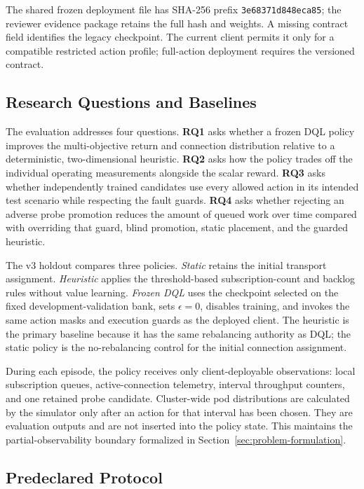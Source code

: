 The shared frozen deployment file has SHA-256 prefix
\texttt{3e68371d848eca85}; the reviewer evidence package retains the full hash
and weights. A missing contract field identifies the legacy checkpoint.
The current client permits it only for a compatible restricted action profile;
full-action deployment requires the versioned contract.

\subsection{Research Questions and Baselines}

The evaluation addresses four questions.  \textbf{RQ1} asks whether a frozen
DQL policy improves the multi-objective return and connection distribution
relative to a deterministic, two-dimensional heuristic.  \textbf{RQ2} asks
how the policy trades off the individual operating measurements alongside
the scalar reward. \textbf{RQ3} asks whether independently trained candidates use every allowed action in its
intended test scenario while respecting the fault guards.
\textbf{RQ4} asks whether rejecting an adverse probe promotion reduces the amount of queued work over time compared with overriding that
guard, blind promotion, static placement, and the guarded heuristic.

The v3 holdout compares three policies.  \emph{Static} retains the initial
transport assignment.  \emph{Heuristic} applies the threshold-based
subscription-count and backlog rules without value learning.  \emph{Frozen
DQL} uses the checkpoint selected on the fixed development-validation bank,
sets $\epsilon=0$, disables training, and invokes the same action masks and
execution guards as the deployed client.  The heuristic is the primary
baseline because it has the same rebalancing authority as DQL; the static
policy is the no-rebalancing control for the initial connection assignment.

During each episode, the policy receives only client-deployable observations:
local subscription queues, active-connection telemetry, interval throughput
counters, and one retained probe candidate.  Cluster-wide pod distributions are
calculated by the simulator only after an action for that interval has been
chosen.  They are evaluation outputs and are not inserted into the policy
state.  This maintains the partial-observability boundary formalized in
Section~\ref{sec:problem-formulation}.

\subsection{Predeclared Protocol}

